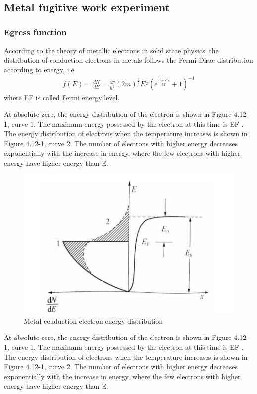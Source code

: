 \documentclass[UTF8]{article}
\begin{document}
   \subsection{Metal fugitive work experiment}
   \subsubsection{Egress function}
   According to the theory of metallic electrons in solid state physics, the distribution of conduction electrons in metals follows the Fermi-Dirac distribution according to energy, i.e
   \begin{eqnarray}
   f(E)=\frac{d N}{d E}=\frac{4 \pi}{h^{3}}(2 m)^{\frac{3}{2}} E^{\frac{1}{2}}\left(e^{\frac{E-E_{F}}{k T}}+1\right)^{-1}
   \end{eqnarray}
   where EF is called Fermi energy level.
   
   At absolute zero, the energy distribution of the electron is shown in Figure 4.12-1, curve 1. The maximum energy possessed by the electron at this time is EF . The energy distribution of electrons when the temperature increases is shown in Figure 4.12-1, curve 2. The number of electrons with higher energy decreases exponentially with the increase in energy, where the few electrons with higher energy have higher energy than E.

	\begin{figure}[H]
        	\centering
        	\includegraphics[clip,scale=1,trim={0 0 0 0}]{fig/fig5.png}
            \caption{Metal conduction electron energy distribution}
            \label{figure.5}
   \end{figure}    
   
   At absolute zero, the energy distribution of the electron is shown in Figure 4.12-1, curve 1. The maximum energy possessed by the electron at this time is EF . The energy distribution of electrons when the temperature increases is shown in Figure 4.12-1, curve 2. The number of electrons with higher energy decreases exponentially with the increase in energy, where the few electrons with higher energy have higher energy than E. 
   
\end{document}
